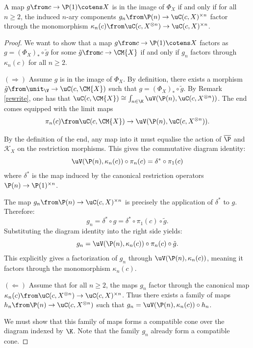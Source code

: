 \documentclass{tac}
\begin{document}
\begin{proposition}
\label{inimage}
    A map $g \from c \to \P(1) \cotens X$ is in the image of $\Phi_X$ if and only if for all $n \ge 2$, the induced $n$-ary components $g_n \from \P(n) \to \uC(c, X)^{\times n}$ factor through the monomorphism $\kappa_n(c) \from \uC(c, X^{\otimes n}) \to \uC(c, X)^{\times n}$.
\end{proposition}
\begin{proof}
    We want to show that a map $g \from c \to  \P(1) \cotens X$ factors as $g = (\Phi_X)_\ast \circ \tilde{g}$ for some $\tilde{g} \from c \to \CM{X} $ if and only if $g_n$ factors through $\kappa_n(c)$ for all $n \ge 2$.

    $(\Rightarrow)$ Assume $g$ is in the image of $\Phi_X$. By definition, there exists a morphism $\tilde{g} \from \unit_{\V} \to \uC(c, \CM{X})$ such that $g = (\Phi_X)_\ast \circ \tilde{g}$. By Remark \ref{rewrite}, one has that $\uC(c, \CM{X}) \cong \int_{n \in \K} \uV(\P(n), \uC(c, X^{\otimes n}))$. The end comes equipped with the limit maps 
    $$\pi_n(c) \from \uC(c, \CM{X}) \to \uV(\P(n), \uC(c, X^{\otimes n})).
    $$

    By the definition of the end, any map into it must equalise the action of $\overline{\P}$ and $\mathcal{K}_X$ on the restriction morphisms. This gives the commutative diagram identity:
    $$
    \uV(\P(n), \kappa_n(c)) \circ \pi_n(c) = \delta^\ast \circ \pi_1(c)
    $$
    where $\delta^\ast$ is the map induced by the canonical restriction operators $\P(n) \to \P(1)^{\times n}$.
    
    The map $g_n \from \P(n) \to \uC(c, X)^{\times n}$ is precisely the application of $\delta^\ast$ to $g$. Therefore:
    $$
    g_n = \delta^\ast \circ g = \delta^\ast \circ \pi_1(c) \circ \tilde{g}.
    $$
    Substituting the diagram identity into the right side yields:
    $$
    g_n = \uV(\P(n), \kappa_n(c)) \circ \pi_n(c) \circ \tilde{g}.
    $$
    This explicitly gives a factorization of $g_n$ through $\uV(\P(n), \kappa_n(c))$, meaning it factors through the monomorphism $\kappa_n(c)$.

    $(\Leftarrow)$ Assume that for all $n \ge 2$, the maps $g_n$ factor through the canonical map $\kappa_n(c) \from \uC(c, X^{\otimes n}) \to \uC(c, X)^{\times n}$.  Thus there exists a family of maps $h_n \from \P(n) \to \uC(c, X^{\otimes n})$ such that $g_n = \uV(\P(n), \kappa_n(c)) \circ h_n$.
    
    We must show that this family of maps forms a compatible cone over the diagram indexed by $\K$. Note that the family $g_n$ already form a compatible cone.
    

\end{proof}
\end{document}
